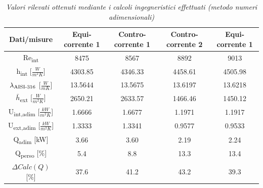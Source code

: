 \documentclass[a4paper,10pt]{article}                                                                                       %
\begin{document}
\begin{table}[ht!]                                                                                                          %
  \centering                                                                                                                %
  \begin{tabular}{||c|c|c|c|c||}                                                                                            %
    \hline
    Dati/misure                                         & Equi-corrente 1 & Contro-corrente 1 & Contro-corrente 2 & Equi-corrente 1 \\
    \hline\hline
    Re\textsubscript{int}                               & 8475            & 8567              & 8892              & 9013            \\
    h\textsubscript{int} [$\frac{W}{m^{2}K}$]           & 4303.85         & 4346.33           & 4458.61           & 4505.98         \\
    $\lambda\textsubscript{AISI-316}$ [$\frac{W}{mK}$]  & 13.5644         & 13.5675           & 13.6197           & 13.6218         \\
    $\bar{h}$\textsubscript{ext} [$\frac{W}{m^{2}K}$]   & 2650.21         & 2633.57           & 1466.46           & 1450.12         \\
    U\textsubscript{int,adim} [$\frac{kW}{m^{2}K}$]     & 1.6666          & 1.6677            & 1.1971            & 1.1917          \\
    U\textsubscript{ext,adim} [$\frac{kW}{m^{2}K}$]     & 1.3333          & 1.3341            & 0.9577            & 0.9533          \\
    Q\textsubscript{adim} [kW]                          & 3.66            & 3.60              & 2.19              & 2.24            \\
    Q\textsubscript{perso} [\%]                         & 5.4             & 8.8               & 13.3              & 13.4            \\
    $\Delta{Calc(Q)}$ [\%]                              & 37.6            & 41.2              & 43.2              & 39.3            \\
    \hline
  \end{tabular}                                                                                                             %
  \caption{\textit{Valori rilevati ottenuti mediante i calcoli ingegneristici effettuati (metodo numeri adimensionali)}}    %
  \label{tab:adim_num_calcs}                                                                                                %
\end{table}                                                                                                                 %
\end{document}
